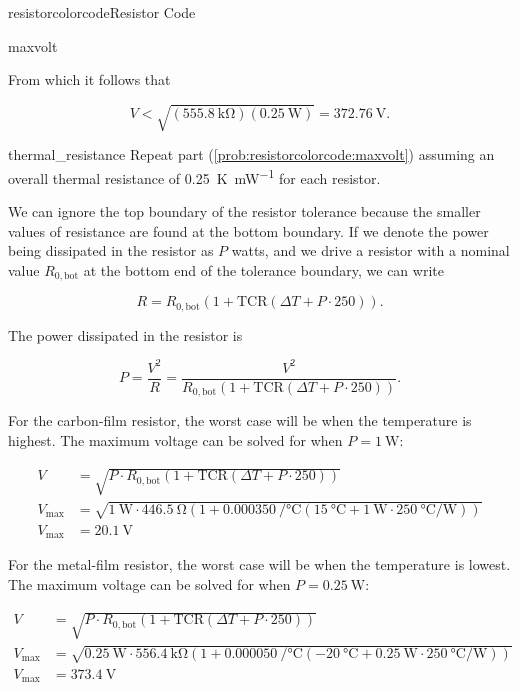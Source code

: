 \begin{mainquestion}{resistorcolorcode}{Resistor Code}
\begin{partquestion}{maxvolt}
\begin{answer}
From which it follows that

\[
V
<
\sqrt{\left(\qty{555.8}{\kilo\ohm}\right)\left(\qty{0.25}{\watt}\right)}
=
\qty{372.76}{\volt}.
\]

\end{answer}
\end{partquestion}

\begin{partquestion}{thermal_resistance}
{Repeat part (\cref{prob:resistorcolorcode:maxvolt}) assuming an overall thermal resistance of \qty{0.25}{\kelvin\per\milli\watt} for each resistor.}

\begin{answer}

We can ignore the top boundary of the resistor tolerance because the smaller values of resistance are found at the bottom boundary. If we denote the power being dissipated in the resistor as $P$ watts, and we drive a resistor with a nominal value $R_{0,\mathrm{bot}}$ at the bottom end of the tolerance boundary, we can write

\[
R
=
R_{0,\mathrm{bot}}
\left(
1+\mathrm{TCR}
\left(
\Delta T
+
P\cdot250
\right)
\right).
\]

The power dissipated in the resistor is

\[
P
=
\frac{V^2}{R}
=
\frac{V^2}
{R_{0,\mathrm{bot}}
\left(
1+\mathrm{TCR}
\left(
\Delta T
+
P\cdot250
\right)
\right)}.
\]

For the carbon-film resistor, the worst case will be when the temperature is highest. The maximum voltage can be solved for when $P=\qty{1}{\watt}$:

\def\power{\qty{1}{\watt}}
\begin{align*}
V &= \sqrt{P \cdot R_{0,\mathrm{bot}}\left(1+\mathrm{TCR}\left(\Delta T+P\cdot250\right)\right)} \\
V_{\text{max}} &= \sqrt{\power \cdot \qty{446.5}{\ohm}\left(1+\qty{0.000350}{\per\celsius}\left(\qty{15}{\celsius}+\power \cdot\qty{250}{\celsius\per\watt}\right)\right)} \\
V_{\text{max}} &= \qty{20.1}{\volt}
\end{align*}

For the metal-film resistor, the worst case will be when the temperature is lowest. The maximum voltage can be solved for when $P=\qty{0.25}{\watt}$:

\def\power{\qty{0.25}{\watt}}
\begin{align*}
V &= \sqrt{P \cdot R_{0,\mathrm{bot}}\left(1+\mathrm{TCR}\left(\Delta T+P\cdot250\right)\right)} \\
V_{\text{max}} &= \sqrt{\power \cdot \qty{556.4}{\kilo\ohm}\left(1+\qty{0.000050}{\per\celsius}\left(\qty{-20}{\celsius}+\power \cdot\qty{250}{\celsius\per\watt}\right)\right)} \\
V_{\text{max}} &= \qty{373.4}{\volt}
\end{align*}

\end{answer}
\end{partquestion}
\end{mainquestion}